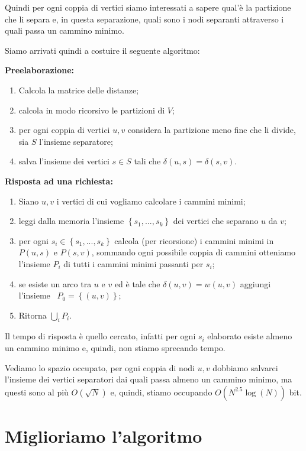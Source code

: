\documentclass[a4paper,10pt]{amsbook}
\theoremstyle{plain}
\theoremstyle{definition}
\theoremstyle{remark}
\newcommand{\set}[1]{\left\{#1\right\}}
\newcommand{\pa}[1]{\left(#1\right)}
\begin{document}
Quindi per ogni coppia di vertici siamo interessati a sapere qual'\`e
la partizione che li separa e, in questa separazione, quali sono i
nodi separanti attraverso i quali passa un cammino minimo.

Siamo arrivati quindi a costuire il seguente algoritmo:

\textbf{Preelaborazione:}
\begin{enumerate}
\item Calcola la matrice delle distanze;
\item calcola in modo ricorsivo le partizioni di $V$;
\item per ogni coppia di vertici $u,v$ considera la partizione meno
  fine che li divide, sia $S$ l'insieme separatore;
\item salva l'insieme dei vertici $s\in S$ tali che $\delta\pa{u,s} =
  \delta\pa{s,v}$.
\end{enumerate}

\textbf{Risposta ad una richiesta:}
\begin{enumerate}
\item Siano $u,v$ i vertici di cui vogliamo calcolare i cammini minimi;
\item leggi dalla memoria l'insieme $\set{s_1,...,s_k}$ dei vertici che
  separano $u$ da $v$;
\item per ogni $s_i \in \set{s_1,...,s_k}$ calcola (per ricorsione) i
  cammini minimi in $P(u,s)$ e $P(s,v)$, sommando ogni possibile
  coppia di cammini otteniamo l'insieme $P_i$ di tutti i cammini
  minimi passanti per $s_i$;
\item se esiste un arco tra $u$ e $v$ ed \`e tale che $\delta\pa{ u,v}
  = w(u,v)$ aggiungi l'insieme~ $P_0 = \set{ (u,v) }$;
\item Ritorna $\bigcup _i P_i$.
\end{enumerate}

Il tempo di risposta \`e quello cercato, infatti per ogni $s_i$
elaborato esiste almeno un cammino minimo e, quindi, non stiamo
sprecando tempo.

Vediamo lo spazio occupato, per ogni coppia di nodi $u,v$ dobbiamo
salvarci l'insieme dei vertici separatori dai quali passa almeno un
cammino minimo, ma questi sono al pi\`u $O\pa{ \sqrt{N}}$ e, quindi,
stiamo occupando $O\pa{ N^{2.5} \log\pa{ N} }$ bit.

\section{Miglioriamo l'algoritmo}
\end{document}
